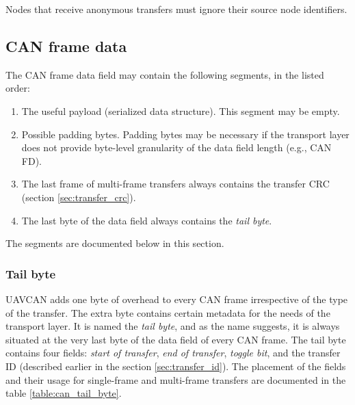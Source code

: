 Nodes that receive anonymous transfers must ignore their source node identifiers.

\subsection{CAN frame data}

The CAN frame data field may contain the following segments, in the listed order:
\begin{samepage}
\begin{enumerate}
    \item The useful payload (serialized data structure). This segment may be empty.
    \item Possible padding bytes.
          Padding bytes may be necessary if the transport layer does not provide byte-level
          granularity of the data field length (e.g., CAN FD).
    \item The last frame of multi-frame transfers always contains the transfer CRC (section \ref{sec:transfer_crc}).
    \item The last byte of the data field always contains the \emph{tail byte}.
\end{enumerate}
\end{samepage}
The segments are documented below in this section.

\subsubsection{Tail byte}

UAVCAN adds one byte of overhead to every CAN frame irrespective of the type of the transfer.
The extra byte contains certain metadata for the needs of the transport layer.
It is named the \emph{tail byte}, and as the name suggests, it is always situated
at the very last byte of the data field of every CAN frame.
The tail byte contains four fields: \emph{start of transfer}, \emph{end of transfer},
\emph{toggle bit}, and the transfer ID (described earlier in the section \ref{sec:transfer_id}).
The placement of the fields and their usage for single-frame and multi-frame transfers
are documented in the table \ref{table:can_tail_byte}.

